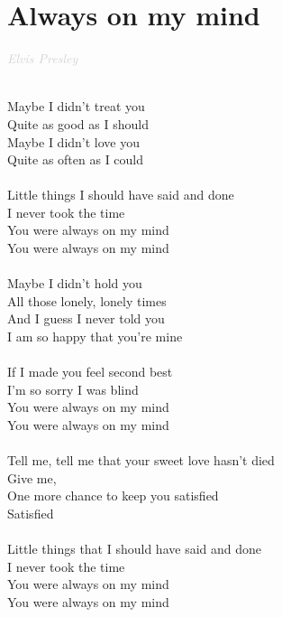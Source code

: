\documentclass[a5paper, 10pt]{book}
\begin{document}
\section{Always on my mind}\textcolor{lightgray}{\textit{Elvis Presley}}\\~\\
\begin{minipage}[t]{0.8\textwidth}
Maybe I didn't treat you\\
Quite as good as I should\\
Maybe I didn't love you\\
Quite as often as I could\\
\\
\hspace*{3mm}Little things I should have said and done\\
\hspace*{3mm}I never took the time\\
\hspace*{3mm}You were always on my mind\\
\hspace*{3mm}You were always on my mind\\
\\
Maybe I didn't hold you\\
All those lonely, lonely times\\
And I guess I never told you\\
I am so happy that you're mine\\
\\
\hspace*{3mm}If I made you feel second best\\
\hspace*{3mm}I'm so sorry I was blind\\
\hspace*{3mm}You were always on my mind\\
\hspace*{3mm}You were always on my mind\\
\\
\hspace*{6mm}Tell me, tell me that your sweet love hasn't died\\
\hspace*{6mm}Give me,\\
\hspace*{6mm}One more chance to keep you satisfied\\
\hspace*{6mm}Satisfied\\
\\
\hspace*{3mm}Little things that I should have said and done\\
\hspace*{3mm}I never took the time\\
\hspace*{3mm}You were always on my mind\\
\hspace*{3mm}You were always on my mind\\
\end{minipage}
\end{document}
